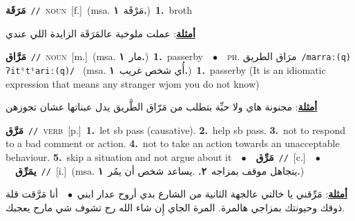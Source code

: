 \documentclass[10pt,a4paper,twoside]{article} %
\begin{document}
\begin{multicols}{2}
{\setlength\topsep{0pt}\textbf{\foreignlanguage{arabic}{مَرَقَة}}\ {\color{gray}\texttt{//}\color{black}}\ \textsc{noun}\ [f.]\ \color{gray}(msa. \foreignlanguage{arabic}{مَرْقَة}~\foreignlanguage{arabic}{\textbf{١.}})\color{black}\ \textbf{1.}~broth\  \begin{flushright}\color{gray}\foreignlanguage{arabic}{\textbf{\underline{\foreignlanguage{arabic}{أمثلة}}}: عملت ملوخية عالمَرَقَة الزايدة اللي عندي}\end{flushright}\color{black}} \vspace{2mm}

{\setlength\topsep{0pt}\textbf{\foreignlanguage{arabic}{مَرَّاق}}\ {\color{gray}\texttt{//}\color{black}}\ \textsc{noun}\ [m.]\ \color{gray}(msa. \foreignlanguage{arabic}{مار}~\foreignlanguage{arabic}{\textbf{١.}})\color{black}\ \textbf{1.}~passerby\ \ $\bullet$\ \ \textsc{ph.} \color{gray} \foreignlanguage{arabic}{مرَاق الطريق}\color{black}\ {\color{gray}\texttt{/{\sffamily marraː(q) ʔitˤtˤariː(q)}/}\color{black}}\ \color{gray} (msa. \foreignlanguage{arabic}{أُي شخص غريب}~\foreignlanguage{arabic}{\textbf{١.}})\color{black}\ \textbf{1.}~passerby (It is an idiomatic expression that means any stranger wjom you do not know)\  \begin{flushright}\color{gray}\foreignlanguage{arabic}{\textbf{\underline{\foreignlanguage{arabic}{أمثلة}}}: مجنونة هاي ولا حبِّة بتطلب من مَرّاق الطَّريق يدل عبناتها عشان تجوزهن}\end{flushright}\color{black}} \vspace{2mm}

{\setlength\topsep{0pt}\textbf{\foreignlanguage{arabic}{مَرَّق}}\ {\color{gray}\texttt{//}\color{black}}\ \textsc{verb}\ [p.]\ \textbf{1.}~let sb pass (causative).  \textbf{2.}~help sb pass.  \textbf{3.}~not to respond to a bad comment or action.  \textbf{4.}~not to take an action towards an unacceptable behaviour.  \textbf{5.}~skip a situation and not argue about it\ \ $\bullet$\ \ \setlength\topsep{0pt}\textbf{\foreignlanguage{arabic}{مَرِّق}}\ {\color{gray}\texttt{//}\color{black}}\ [c.]\ \ $\bullet$\ \ \setlength\topsep{0pt}\textbf{\foreignlanguage{arabic}{يمَرِّق}}\ {\color{gray}\texttt{//}\color{black}}\ [i.]\ \color{gray}(msa. \foreignlanguage{arabic}{يتجاهل موقف بمزاجه}~\foreignlanguage{arabic}{\textbf{٢.}}  .\foreignlanguage{arabic}{يساعد شخص أن يمُر}~\foreignlanguage{arabic}{\textbf{١.}})\color{black}\  \begin{flushright}\color{gray}\foreignlanguage{arabic}{\textbf{\underline{\foreignlanguage{arabic}{أمثلة}}}: مَرِّقني يا خالتي عالجهة الثانية من الشارع بدي أروح عدار ابني\ $\bullet$\ \  أنا مَرَّقت قلة ذوقك وحيونتك بمزاجي هالمرة. المرة الجاي إِن شاء الله رح تشوف شي مارح يعجبك.}\end{flushright}\color{black}} \vspace{2mm}


\end{multicols}
\end{document}
